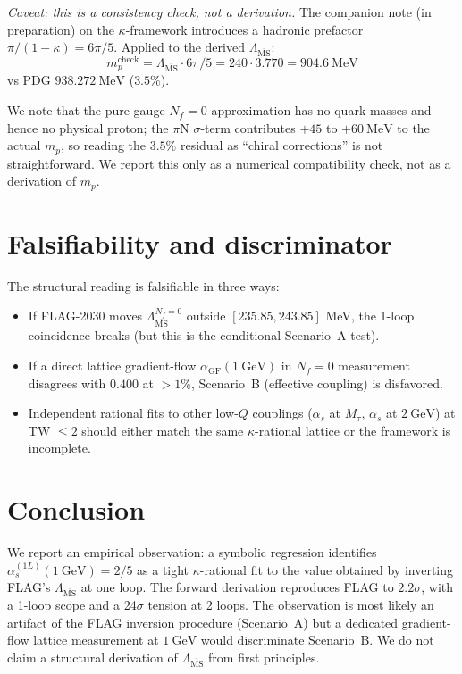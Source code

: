\documentclass[aps,prl,reprint,superscriptaddress,floatfix,nofootinbib,amssymb]{revtex4-2}
\newcommand{\msb}{\overline{\mathrm{MS}}}
\newcommand{\Lqcd}{\Lambda_{\msb}}
\newcommand{\Nf}{N_{f}}
\newcommand{\kap}{\kappa}
\begin{document}
\textit{Caveat: this is a consistency check, not a derivation.} The companion note (in preparation) on the $\kap$-framework introduces a hadronic prefactor $\pi/(1-\kap) = 6\pi/5$. Applied to the derived $\Lqcd$:
\begin{equation}
m_p^{\mathrm{check}} = \Lqcd \cdot 6\pi/5 = 240 \cdot 3.770 = 904.6~\mathrm{MeV}
\end{equation}
vs PDG $938.272~\mathrm{MeV}$ ($3.5\%$).

We note that the pure-gauge $\Nf = 0$ approximation has no quark masses and hence no physical proton; the $\pi$N $\sigma$-term contributes $+45$ to $+60~\mathrm{MeV}$ to the actual $m_p$, so reading the $3.5\%$ residual as ``chiral corrections'' is not straightforward. We report this only as a numerical compatibility check, not as a derivation of $m_p$.

\section{Falsifiability and discriminator}
The structural reading is falsifiable in three ways:
\begin{itemize}
\item If FLAG-2030 moves $\Lqcd^{\Nf=0}$ outside $[235.85, 243.85]$ MeV, the 1-loop coincidence breaks (but this is the conditional Scenario~A test).
\item If a direct lattice gradient-flow $\alpha_{\mathrm{GF}}(1~\mathrm{GeV})$ in $\Nf=0$ measurement disagrees with $0.400$ at $>1\%$, Scenario~B (effective coupling) is disfavored.
\item Independent rational fits to other low-$Q$ couplings ($\alpha_s$ at $M_\tau$, $\alpha_s$ at $2~\mathrm{GeV}$) at TW $\le 2$ should either match the same $\kap$-rational lattice or the framework is incomplete.
\end{itemize}

\section{Conclusion}
We report an empirical observation: a symbolic regression identifies $\alpha_s^{(1L)}(1~\mathrm{GeV}) = 2/5$ as a tight $\kap$-rational fit to the value obtained by inverting FLAG's $\Lqcd$ at one loop. The forward derivation reproduces FLAG to $2.2\sigma$, with a 1-loop scope and a 24$\sigma$ tension at 2 loops. The observation is most likely an artifact of the FLAG inversion procedure (Scenario~A) but a dedicated gradient-flow lattice measurement at $1~\mathrm{GeV}$ would discriminate Scenario~B. We do not claim a structural derivation of $\Lqcd$ from first principles.
\end{document}

